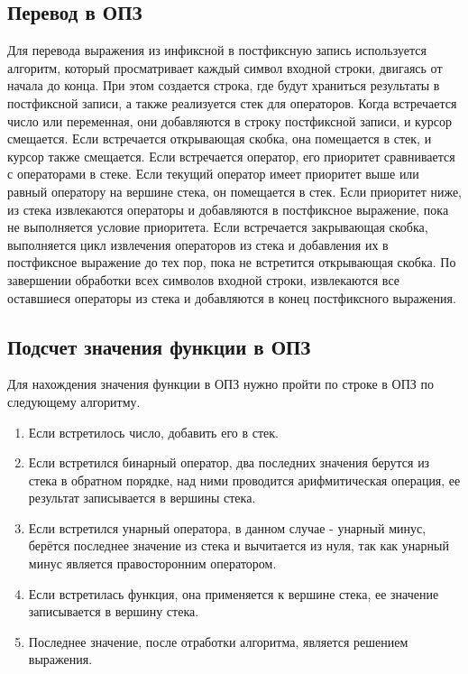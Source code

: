 \documentclass[12pt, a4paper]{article}
\begin{document}
\subsection{Перевод в ОПЗ}
Для перевода выражения из инфиксной в постфиксную запись используется 
алгоритм, который просматривает каждый символ входной строки, двигаясь 
от начала до конца. При этом создается строка, где будут храниться 
результаты в постфиксной записи, а также реализуется стек для 
операторов.
Когда встречается число или переменная, они добавляются в строку 
постфиксной записи, и курсор смещается. Если встречается открывающая 
скобка, она помещается в стек, и курсор также смещается. Если 
встречается оператор, его приоритет сравнивается с операторами в стеке. 
Если текущий оператор имеет приоритет выше или равный оператору на 
вершине стека, он помещается в стек. Если приоритет ниже, из стека 
извлекаются операторы и добавляются в постфиксное выражение, пока не 
выполняется условие приоритета.
Если встречается закрывающая скобка, выполняется цикл извлечения 
операторов из стека и добавления их в постфиксное выражение до тех пор, 
пока не встретится открывающая скобка.
По завершении обработки всех символов входной строки, извлекаются все 
оставшиеся операторы из стека и добавляются в конец постфиксного
выражения.
\subsection{Подсчет значения функции в ОПЗ}
Для нахождения значения функции в ОПЗ нужно пройти по строке в ОПЗ по 
следующему алгоритму.
\begin{enumerate}
	\item Если встретилось число, добавить его в стек.
	\item Если встретился бинарный оператор, два последних значения 
	берутся из стека в обратном порядке, над ними проводится
	арифмитическая операция, ее результат записывается в вершины стека.
	\item Если встретился унарный оператора, в данном случае - унарный 
	минус, берётся последнее значение из стека и вычитается из нуля, 
	так как унарный минус является правосторонним оператором.
	\item Если встретилась функция, она применяется к вершине стека,
	ее значение записывается в вершину стека.
	\item Последнее значение, после отработки алгоритма, является 
	решением выражения.
\end{enumerate}
\end{document}
